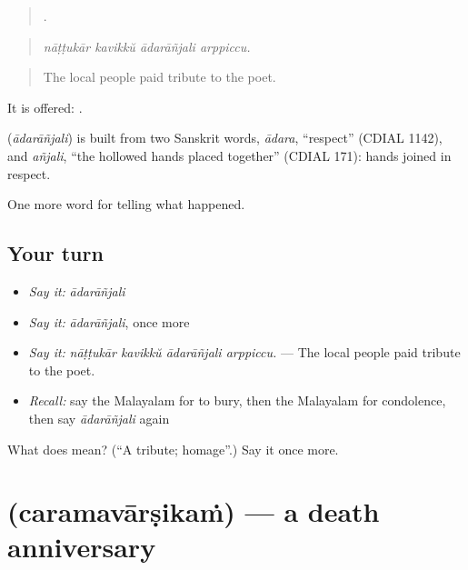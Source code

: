 \begin{quote}
   .
\end{quote}

\begin{quote}
\emph{nāṭṭukār kavikkŭ ādarāñjali arppiccu.}
\end{quote}

\begin{quote}
The local people paid tribute to the poet.
\end{quote}

It is offered:  .

\begin{cousinweb}
\textbf{} (\emph{ādarāñjali}) is built from two Sanskrit words, \emph{ādara}, \textquotedblleft{}respect\textquotedblright{} (CDIAL 1142), and \emph{añjali}, \textquotedblleft{}the hollowed hands placed together\textquotedblright{} (CDIAL 171): hands joined in respect.
\end{cousinweb}

\begin{grammarlens}[title={What you've built}]
One more word for telling what happened.
\end{grammarlens}

\subsection*{Your turn}
\begin{itemize}
\raggedright
  \item \emph{Say it:} \emph{ādarāñjali}
  \item \emph{Say it:} \emph{ādarāñjali}, once more
  \item \emph{Say it:} \emph{nāṭṭukār kavikkŭ ādarāñjali arppiccu.} — The local people paid tribute to the poet.
  \item \emph{Recall:} say the Malayalam for to bury, then the Malayalam for condolence, then say \emph{ādarāñjali} again
\end{itemize}

\begin{tcolorbox}[breakable,colback=teal!4,colframe=teal!35!black,title={Before you move on}]
What does  mean? (\textquotedblleft{}A tribute; homage\textquotedblright{}.) Say it once more.
\end{tcolorbox}
\section[\texorpdfstring{\ml{ചരമവാർഷികം} (caramavārṣikaṁ)}{ചരമവാർഷികം (caramavārṣikaṁ)}]{ (caramavārṣikaṁ) — a death anniversary}

